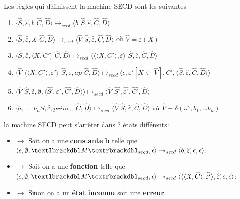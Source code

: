 \documentclass[10pt,a4paper]{report}
\begin{document}
Les règles qui définissent la machine SECD sont les suivantes :
\smallbreak
\begin{enumerate}
\item $\langle\widehat{S},\widehat{\varepsilon},b$ $\widehat{C},\widehat{D}\rangle \longmapsto_{secd} \langle b$ $\widehat{S},\widehat{\varepsilon},\widehat{C},\widehat{D}\rangle$
\item $\langle\widehat{S},\widehat{\varepsilon},X$ $\widehat{C},\widehat{D}\rangle \longmapsto_{secd} \langle \widehat{V}$ $\widehat{S},\widehat{\varepsilon},\widehat{C},\widehat{D}\rangle$ où $\widehat{V} = \varepsilon(X)$
\item $\langle\widehat{S},\widehat{\varepsilon},\langle X,C'\rangle$ $\widehat{C},\widehat{D}\rangle \longmapsto_{secd} \langle\langle\langle X,C'\rangle,\varepsilon\rangle$ $\widehat{S},\widehat{\varepsilon},\widehat{C},\widehat{D}\rangle$
\item $\langle\widehat{V}$ $\langle\langle X,C'\rangle,\varepsilon'\rangle$ $\widehat{S},\widehat{\varepsilon},ap$ $\widehat{C},\widehat{D}\rangle \longmapsto_{secd} \langle\epsilon,\varepsilon'[X \leftarrow \widehat{V}],C',\langle\widehat{S},\widehat{\varepsilon},\widehat{C},\widehat{D}\rangle\rangle$
\item $\langle\widehat{V}$ $\widehat{S},\widehat{\varepsilon},\emptyset,\langle\widehat{S'},\widehat{\varepsilon'},\widehat{C'},\widehat{D}\rangle\rangle \longmapsto_{secd} \langle \widehat{V}$ $\widehat{S'},\widehat{\varepsilon'},\widehat{C'},\widehat{D}\rangle$
\item $\langle b_{1}$ $...$ $b_{n}\widehat{S},\widehat{\varepsilon},prim_{o^{n}}$ $\widehat{C},\widehat{D}\rangle \longmapsto_{secd} \langle \widehat{V}$ $\widehat{S},\widehat{\varepsilon},\widehat{C},\widehat{D}\rangle$ où $\widehat{V} = \delta(o^{n},b_1,...b_{n})$
\end{enumerate}
\bigbreak


la machine SECD peut s'arrêter dans 3 états différents:
\begin{itemize}
\item[]$\longrightarrow$ Soit on a une \textbf{constante b} telle que $\langle \epsilon,\emptyset,\textlbrackdbl M\textrbrackdbl_{secd},\epsilon\rangle \twoheadrightarrow_{secd} \langle b,\widehat{\varepsilon},\epsilon,\epsilon\rangle$;
\item[]$\longrightarrow$ Soit on a une \textbf{fonction} telle que $\langle \epsilon,\emptyset,\textlbrackdbl M\textrbrackdbl_{secd},\epsilon\rangle \twoheadrightarrow_{secd} \langle\langle\langle X,\widehat{C}\rangle,\widehat{\varepsilon'}\rangle,\widehat{\varepsilon},\epsilon,\epsilon\rangle$;
\item[]$\longrightarrow$ Sinon on a un \textbf{état inconnu} soit une \textbf{erreur}.
\end{itemize}
\bigbreak
\end{document}
